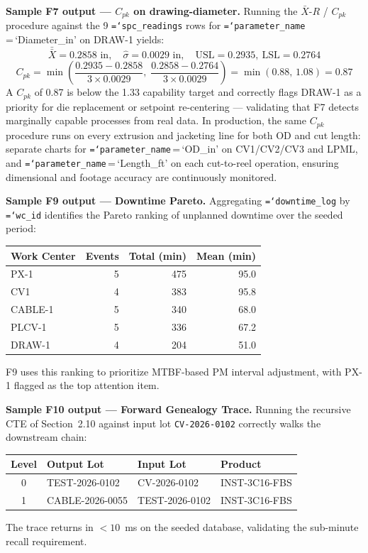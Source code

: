 \documentclass[11pt]{article}
\newcommand{\tfield}[1]{\texttt{\hyphenchar\font=`\-\relax #1}}
\begin{document}
\textbf{Sample F7 output --- $C_{pk}$ on drawing-diameter.}  Running the $\bar{X}$-$R$ / $C_{pk}$ procedure against the 9 \tfield{spc\_readings} rows for \tfield{parameter\_name}\,=\,`Diameter\_in' on DRAW-1 yields:
\[
\bar{\bar{X}} = 0.2858\text{ in}, \quad \hat{\sigma} = 0.0029\text{ in}, \quad \text{USL} = 0.2935,\ \text{LSL} = 0.2764
\]
\[
C_{pk} = \min\!\left(\frac{0.2935 - 0.2858}{3\times 0.0029},\; \frac{0.2858 - 0.2764}{3\times 0.0029}\right) = \min(0.88,\,1.08) = \mathbf{0.87}
\]
A $C_{pk}$ of 0.87 is below the 1.33 capability target and correctly flags DRAW-1 as a priority for die replacement or setpoint re-centering --- validating that F7 detects marginally capable processes from real data.  In production, the same $C_{pk}$ procedure runs on every extrusion and jacketing line for both OD and cut length: separate charts for \tfield{parameter\_name}\,=\,`OD\_in' on CV1/CV2/CV3 and LPML, and \tfield{parameter\_name}\,=\,`Length\_ft' on each cut-to-reel operation, ensuring dimensional and footage accuracy are continuously monitored.

\textbf{Sample F9 output --- Downtime Pareto.}  Aggregating \tfield{downtime\_log} by \tfield{wc\_id} identifies the Pareto ranking of unplanned downtime over the seeded period:
\begin{center}\small
\begin{tabular}{@{} l r r r @{}}
\toprule
\textbf{Work Center} & \textbf{Events} & \textbf{Total (min)} & \textbf{Mean (min)} \\
\midrule
PX-1    & 5 & 475 & 95.0 \\
CV1     & 4 & 383 & 95.8 \\
CABLE-1 & 5 & 340 & 68.0 \\
PLCV-1  & 5 & 336 & 67.2 \\
DRAW-1  & 4 & 204 & 51.0 \\
\bottomrule
\end{tabular}
\end{center}
F9 uses this ranking to prioritize MTBF-based PM interval adjustment, with PX-1 flagged as the top attention item.

\textbf{Sample F10 output --- Forward Genealogy Trace.}  Running the recursive CTE of Section~2.10 against input lot \texttt{CV-2026-0102} correctly walks the downstream chain:
\begin{center}\small
\begin{tabular}{@{} c l l l @{}}
\toprule
\textbf{Level} & \textbf{Output Lot} & \textbf{Input Lot} & \textbf{Product} \\
\midrule
0 & TEST-2026-0102   & CV-2026-0102   & INST-3C16-FBS \\
1 & CABLE-2026-0055  & TEST-2026-0102 & INST-3C16-FBS \\
\bottomrule
\end{tabular}
\end{center}
The trace returns in $<10$~ms on the seeded database, validating the sub-minute recall requirement.
\end{document}
